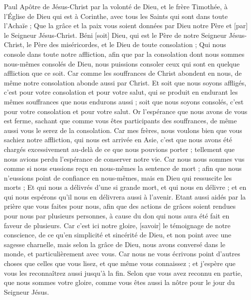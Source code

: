 \BFont
\begin{multicols}{2}
\VerseOne{}Paul Apôtre de Jésus-Christ par la volonté de Dieu, et le frère Timothée, à l'Église de Dieu qui est à Corinthe, avec tous les Saints qui sont dans toute l'Achaïe ;
Que la grâce et la paix vous soient données par Dieu notre Père et [par] le Seigneur Jésus-Christ.
Béni [soit] Dieu, qui est le Père de notre Seigneur Jésus-Christ, le Père des miséricordes, et le Dieu de toute consolation ;
Qui nous console dans toute notre affliction, afin que par la consolation dont nous sommes nous-mêmes consolés de Dieu, nous puissions consoler ceux qui sont en quelque affliction que ce soit.
Car comme les souffrances de Christ abondent en nous, de même notre consolation abonde aussi par Christ.
Et soit que nous soyons affligés, c'est pour votre consolation et pour votre salut, qui se produit en endurant les mêmes souffrances que nous endurons aussi ; soit que nous soyons consolés, c'est pour votre consolation et pour votre salut.
Or l'espérance que nous avons de vous est ferme, sachant que comme vous êtes participants des souffrances, de même aussi vous le serez de la consolation.
Car mes frères, nous voulons bien que vous sachiez notre affliction, qui nous est arrivée en Asie, c'est que nous avons été chargés excessivement au-delà de ce que nous pouvions porter ; tellement que nous avions perdu l'espérance de conserver notre vie.
Car nous nous sommes vus comme si nous eussions reçu en nous-mêmes la sentence de mort ; afin que nous n'eussions point de confiance en nous-mêmes, mais en Dieu qui ressuscite les morts ;
Et qui nous a délivrés d'une si grande mort, et qui nous en délivre ; et en qui nous espérons qu'il nous en délivrera aussi à l'avenir.
Etant aussi aidés par la prière que vous faites pour nous, afin que des actions de grâces soient rendues pour nous par plusieurs personnes, à cause du don qui nous aura été fait en faveur de plusieurs.
Car c'est ici notre gloire, [savoir] le témoignage de notre conscience, de ce qu'en simplicité et sincérité de Dieu, et non point avec une sagesse charnelle, mais selon la grâce de Dieu, nous avons conversé dans le monde, et particulièrement avec vous.
Car nous ne vous écrivons point d'autres choses que celles que vous lisez, et que même vous connaissez ; et j'espère que vous les reconnaîtrez aussi jusqu'à la fin.
Selon que vous avez reconnu en partie, que nous sommes votre gloire, comme vous êtes aussi la nôtre pour le jour du Seigneur Jésus.

\end{multicols}
